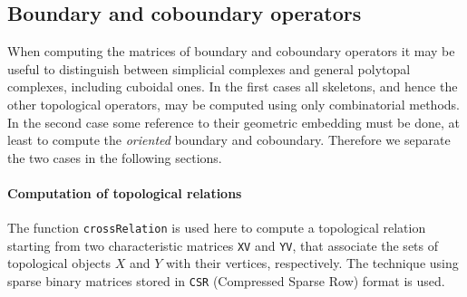 \documentclass[11pt,oneside]{article}	%
\begin{document}
\subsection{Boundary and coboundary operators}

When computing the matrices of boundary and coboundary operators it may be useful to distinguish between simplicial complexes and general polytopal complexes, including  cuboidal ones. In the first cases all skeletons, and hence the other topological operators, may be computed using only combinatorial methods. In the second case some reference to their geometric embedding must be done, at least to compute the \emph{oriented} boundary and coboundary. Therefore we separate the two cases in the following sections.


\paragraph{Computation of topological relations} 
The function \texttt{crossRelation} is used here to compute a topological relation starting from two characteristic matrices \texttt{XV} and \texttt{YV}, that associate the sets of topological objects $X$ and $Y$ with their vertices, respectively.
The technique using sparse binary matrices stored in \texttt{CSR} (Compressed Sparse Row) format is used.
\end{document}
